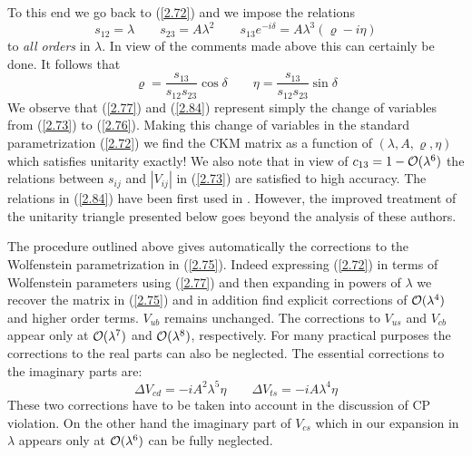 To this end
we go back to (\ref{2.72}) and we impose the relations \cite{burasetal:94b}
\begin{equation}\label{2.77} 
s_{12}=\lambda
\qquad
s_{23}=A \lambda^2
\qquad
s_{13} e^{-i\delta}=A \lambda^3 (\varrho-i \eta)
\end{equation}
to {\it  all orders} in $\lambda$. In view of the comments made above
this can certainly be done. It follows that
\begin{equation}\label{2.84} 
\varrho=\frac{s_{13}}{s_{12}s_{23}}\cos\delta
\qquad
\eta=\frac{s_{13}}{s_{12}s_{23}}\sin\delta
\end{equation}
We observe that (\ref{2.77}) and (\ref{2.84}) represent simply
the change of variables from (\ref{2.73}) to (\ref{2.76}).
Making this change of variables in the standard parametrization 
(\ref{2.72}) we find the CKM matrix as a function of 
$(\lambda,A,\varrho,\eta)$ which satisfies unitarity exactly!
We also note that in view of $c_{13}=1-{\cal O}(\lambda^6)$ the relations
between $s_{ij}$ and $| V_{ij}|$ in (\ref{2.73}) are 
satisfied to high accuracy. The relations in (\ref{2.84}) have
been first used in \cite{schmidtlerschubert:92}.
However, the improved treatment of the unitarity
triangle presented below goes beyond the analysis of these authors.

The procedure outlined above gives automatically the corrections to the
Wolfenstein parametrization in (\ref{2.75}).  Indeed expressing
(\ref{2.72}) in terms of Wolfenstein parameters using (\ref{2.77})
and then expanding in powers of $\lambda$ we recover the
matrix in (\ref{2.75}) and in addition find explicit corrections of
${\cal O}(\lambda^4)$ and higher order terms. $V_{ub}$ remains unchanged. The
corrections to $V_{us}$ and $V_{cb}$ appear only at ${\cal O}(\lambda^7)$ and
${\cal O}(\lambda^8)$, respectively.  For many practical purposes the
corrections to the real parts can also be neglected.
The essential corrections to the imaginary parts are:
\begin{equation}\label{2.83g}
\Delta V_{cd}=-iA^2 \lambda^5\eta
\qquad
\Delta V_{ts}=-iA\lambda^4\eta 
\end{equation}
These two corrections have to be
taken into account in the discussion of CP violation.
On the other hand the imaginary part of $V_{cs}$ which in our expansion
in $\lambda$ appears only at ${\cal O}(\lambda^6)$ can be fully neglected. 

